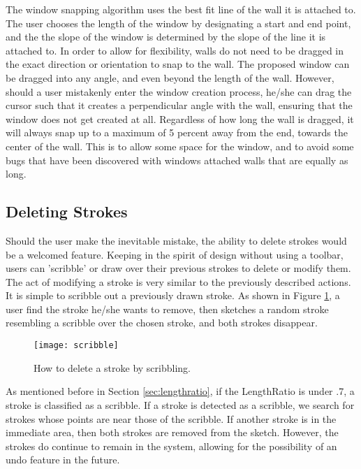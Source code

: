 The window snapping algorithm uses the best fit line of the wall it is attached to. The user chooses the length of the window by designating a start and end point, and the the slope of the window is determined by the slope of the line it is attached to. In order to allow for flexibility, walls do not need to be dragged in the exact direction or orientation to snap to the wall. The proposed window can be dragged into any angle, and even beyond the length of the wall. However, should a user mistakenly enter the window creation process, he/she can drag the cursor such that it creates a perpendicular angle with the wall, ensuring that the window does not get created at all. Regardless of how long the wall is dragged, it will always snap up to a maximum of 5 percent away from the end, towards the center of the wall. This is to allow some space for the window, and to avoid some bugs that have been discovered with windows attached walls that are equally as long.

\subsection{Deleting Strokes}

Should the user make the inevitable mistake, the ability to delete strokes would be a welcomed feature. Keeping in the spirit of design without using a toolbar, users can 'scribble' or draw over their previous strokes to delete or modify them. The act of modifying a stroke is very similar to the previously described actions. \\

It is simple to scribble out a previously drawn stroke. As shown in Figure \ref{fig:scribble}, a user find the stroke he/she wants to remove, then sketches a random stroke resembling a scribble over the chosen stroke, and both strokes disappear.

\begin{figure}[ht]
\centering
\texttt{[image: scribble]}
\caption[How to delete a stroke by scribbling]{How to delete a stroke by scribbling.}
\label{fig:scribble}
\end{figure}

As mentioned before in Section \ref{sec:lengthratio}, if the LengthRatio is under .7, a stroke is classified as a scribble. If a stroke is detected as a scribble, we search for strokes whose points are near those of the scribble. If another stroke is in the immediate area, then both strokes are removed from the sketch. However, the strokes do continue to remain in the system, allowing for the possibility of an undo feature in the future.\\

